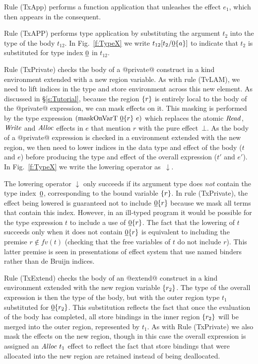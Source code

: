 Rule (TxApp) performs a function application that unleashes the effect $e_1$, which then appears in the consequent.

Rule (TxAPP) performs type application by substituting the argument $t_2$ into the type of the body $t_{12}$. In Fig.~\ref{f:TypeX} we write $t_{12}[t_2/\underline{0}\{a\}]$ to indicate that $t_2$ is substituted for type index $\underline{0}$ in $t_{12}$.

Rule (TxPrivate) checks the body of a @private@ construct in a kind environment extended with a new region variable. As with rule (TvLAM), we need to lift indices in the type and store environment across this new element. As discussed in \S\ref{s:Tutorial}, because the region $\{r\}$ is entirely local to the body of the @private@ expression, we can mask effects on it. This masking is performed by the type expression $(\textrm{maskOnVarT}~ \underline{0}\{r\}~ e)$ which replaces the atomic $\mathit{Read}$, $\mathit{Write}$ and $\mathit{Alloc}$ effects in $e$ that mention $r$ with the pure effect~$\bot$. As the body of a @private@ expression is checked in a environment extended with the new region, we then need to lower indices in the data type and effect of the body ($t$ and $e$) before producing the type and effect of the overall expression ($t'$ and $e'$). In Fig.~\ref{f:TypeX} we write the lowering operator as~$\downarrow$. 





The lowering operator $\downarrow$ only succeeds if its argument type does \emph{not} contain the type index~$\underline{0}$, corresponding to the bound variable $\{r\}$. In rule (TxPrivate), the effect being lowered is guaranteed not to include $\underline{0}\{r\}$ because we mask all terms that contain this index. However, in an ill-typed program it would be possible for the type expression $t$ to include a use of $\underline{0}\{r\}$. The fact that the lowering of $t$ succeeds only when it does not contain $\underline{0}\{r\}$ is equivalent to including the premise $r \notin fv(t)$ (checking that the free variables of $t$ do not include $r$). This latter premise is seen in presentations of effect system that use named binders rather than de Bruijn indices.

Rule (TxExtend) checks the body of an @extend@ construct in a kind environment extended with the new region variable $\{r_2\}$. The type of the overall expression is then the type of the body, but with the outer region type $t_1$ substituted for $\underline{0}\{r_2\}$. This substitution reflects the fact that once the evaluation of the body has completed, all store bindings in the inner region $\{r_2\}$ will be merged into the outer region, represented by $t_1$. As with Rule (TxPrivate) we also mask the effects on the new region, though in this case the overall expression is assigned an $\mathit{Alloc}~ t_1$ effect to reflect the fact that store bindings that were allocated into the new region are retained instead of being deallocated.

